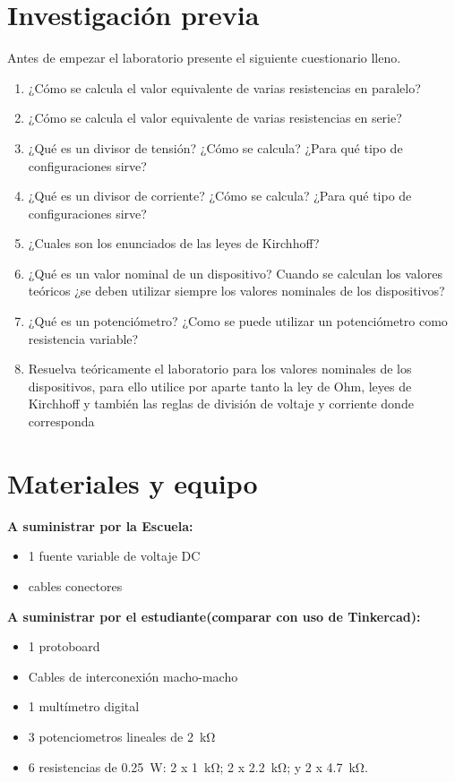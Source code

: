 \documentclass[12pt,letterpaper]{report}
\newcommand{\inv}{Investigación previa}
\newcommand{\mat}{Materiales y equipo}
\newcommand{\antesde}{Antes de empezar el laboratorio presente el siguiente cuestionario lleno.}
\begin{document}
\section{\inv}
\antesde
\begin{enumerate}
\item	¿Cómo se calcula el valor equivalente de varias resistencias en paralelo?
\item	¿Cómo se calcula el valor equivalente de varias resistencias en serie?
\item	¿Qué es un divisor de tensión? ¿Cómo se calcula? ¿Para qué tipo de configuraciones sirve?
\item	¿Qué es un divisor de corriente? ¿Cómo se calcula? ¿Para qué tipo de configuraciones sirve?
\item	¿Cuales son los enunciados de las leyes de Kirchhoff?
\item	¿Qué es un valor nominal de un dispositivo? Cuando se calculan los valores teóricos ¿se deben utilizar siempre los valores nominales de los dispositivos?
\item	¿Qué es un potenciómetro? ¿Como se puede utilizar un potenciómetro como resistencia variable?
\item	Resuelva teóricamente el laboratorio para los valores nominales de los dispositivos, para ello utilice por aparte tanto la ley de Ohm, leyes de Kirchhoff y también las reglas de división de voltaje y corriente donde corresponda
\end{enumerate}

\section{\mat}
\textbf{A suministrar por la Escuela:}
\begin{itemize}
\item	1 fuente variable de voltaje DC
\item   cables conectores
\end{itemize}
\textbf{A suministrar por el estudiante(comparar con uso de Tinkercad):}
\begin{itemize}
\item   1 protoboard
\item   Cables de interconexión macho-macho
\item   1 multímetro digital
\item   3 potenciometros lineales de \SI{2}{\kilo\ohm}
\item   6 resistencias de \SI{0,25}{\watt}: 2 x \SI{1}{\kilo\ohm}; 2 x \SI{2,2}{\kilo\ohm}; y 2 x \SI{4,7}{\kilo\ohm}.
\end{itemize}
\end{document}
